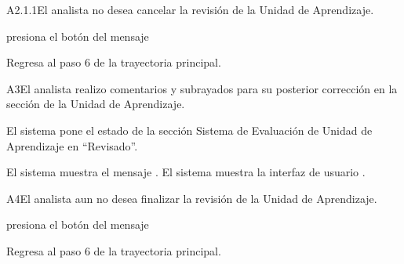 	
\begin{UCtrayectoriaA}{A2.1.1}{El analista no desea cancelar la revisión de la Unidad de Aprendizaje.} 

	\hypertarget{SP2-CU9-A2.1.1}{\UCpaso[\UCactor] presiona el botón  del mensaje }
    \UCpaso Regresa al paso 6 de la trayectoria principal. 
\end{UCtrayectoriaA}

	
\begin{UCtrayectoriaA}{A3}{El analista realizo comentarios y subrayados para su posterior corrección en la sección de la Unidad de Aprendizaje.} 

	\hypertarget{SP2-CU9-A3}{\UCpaso El sistema pone el estado de la sección Sistema de Evaluación de Unidad de Aprendizaje en “Revisado”.}
    \UCpaso El sistema muestra el mensaje .
    \UCpaso El sistema muestra la interfaz de usuario .
\end{UCtrayectoriaA}

	
\begin{UCtrayectoriaA}{A4}{El analista aun no desea finalizar la revisión de la Unidad de Aprendizaje.} 

	\hypertarget{SP2-CU9-A4}{\UCpaso[\UCactor] presiona el botón  del mensaje }
    \UCpaso Regresa al paso 6 de la trayectoria principal. 
\end{UCtrayectoriaA}